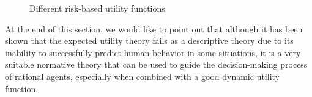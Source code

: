\begin{figure}[H]
\begin{minipage}{.3\textwidth}
    \end{minipage}
    \hspace{1em}
    \begin{minipage}{.3\textwidth}
      \centering
    \end{minipage}
    \caption{Different risk-based utility functions}
    \label{fig:risk-based-utility}
\end{figure}

At the end of this section, we would like to point out that although it has been shown \cite{kahneman2013prospect} that the expected utility theory fails as a descriptive theory due to its inability to successfully predict human behavior in some situations, it is a very suitable normative theory that can be used to guide the decision-making process of rational agents, especially when combined with a good dynamic utility function.
